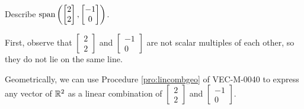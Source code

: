 \documentclass{ximera}
\begin{document}
\begin{example}
Describe $\textnormal{span}\left(\begin{bmatrix}2\\2\end{bmatrix}, \begin{bmatrix}-1\\0\end{bmatrix}\right)$.
\begin{explanation}
First, observe that $\begin{bmatrix}2\\2\end{bmatrix}$ and $\begin{bmatrix}-1\\0\end{bmatrix}$ are not scalar multiples of each other, so they do not lie on the same line.  

\begin{image}[3in]
\end{image}


Geometrically, we can use Procedure \ref{pro:lincombgeo} of VEC-M-0040 to express any vector of $\mathbb{R}^2$ as a linear combination of $\begin{bmatrix}2\\2\end{bmatrix}$ and  $\begin{bmatrix}-1\\0\end{bmatrix}$.  


\end{explanation}
\end{example}
\end{document}
